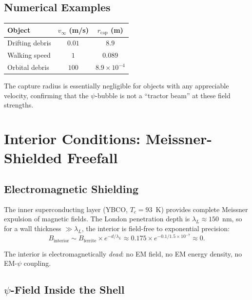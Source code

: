 \documentclass[amsmath,amssymb,aps,prd,superscriptaddress,nofootinbib]{revtex4-2}
\begin{document}
\subsection{Numerical Examples}

\begin{center}
\begin{tabular}{lcc}
\toprule
Object & $v_\infty$ (m/s) & $r_\text{cap}$ (m) \\
\midrule
Drifting debris & $0.01$ & $8.9$ \\
Walking speed & $1$ & $0.089$ \\
Orbital debris & $100$ & $8.9 \times 10^{-4}$ \\
\bottomrule
\end{tabular}
\end{center}

The capture radius is essentially negligible for objects with any
appreciable velocity, confirming that the $\psi$-bubble is not a
``tractor beam'' at these field strengths.

\section{Interior Conditions: Meissner-Shielded Freefall}\label{sec:interior}

\subsection{Electromagnetic Shielding}

The inner superconducting layer (YBCO, $T_c = 93$~K) provides complete
Meissner expulsion of magnetic fields. The London penetration depth is
$\lambda_L \approx 150$~nm, so for a wall thickness $\gg \lambda_L$,
the interior is field-free to exponential precision:
\begin{equation}
B_\text{interior} \sim B_\text{ferrite} \times e^{-d/\lambda_L}
\approx 0.175 \times e^{-0.1/1.5 \times 10^{-7}} \approx 0.
\end{equation}

The interior is electromagnetically \emph{dead}: no EM field, no EM
energy density, no EM-$\psi$ coupling.

\subsection{$\psi$-Field Inside the Shell}
\end{document}
